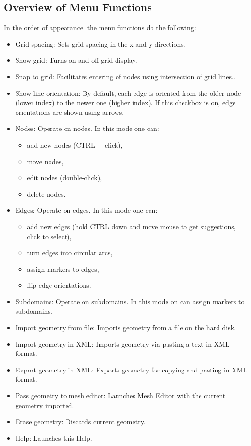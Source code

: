 \documentclass{article}
\begin{document}
\subsection*{Overview of Menu Functions}

In the order of appearance, the menu functions do the following:
\begin{itemize}
\item Grid spacing: Sets grid spacing in the x and y directions.
\item Show grid: Turns on and off grid display.
\item Snap to grid: Facilitates entering of nodes using intersection of grid lines..
\item Show line orientation: By default, each edge is oriented from the older node (lower index) to the newer one (higher index). If this checkbox is on, edge orientations are shown using arrows.  
\item Nodes: Operate on nodes. In this mode one can:
\begin{itemize}
\item add new nodes (CTRL + click), 
\item move nodes, 
\item edit nodes (double-click), 
\item delete nodes.
\end{itemize}
\item Edges: Operate on edges. In this mode one can:
\begin{itemize}
\item add new edges (hold CTRL down and move mouse to get suggestions, click to select), 
\item turn edges into circular arcs,
\item assign markers to edges,
\item flip edge orientations.
\end{itemize}
\item Subdomains: Operate on subdomains. In this mode on can assign markers to subdomains. 
\item Import geometry from file: Imports geometry from a file on the hard disk.
\item Import geometry in XML: Imports geometry via pasting a text in XML format.
\item Export geometry in XML: Exports geometry for copying and pasting in XML format.
\item Pass geometry to mesh editor: Launches Mesh Editor with the current geometry imported.
\item Erase geometry: Discards current geometry.
\item Help: Launches this Help.
\end{itemize}
\end{document}
